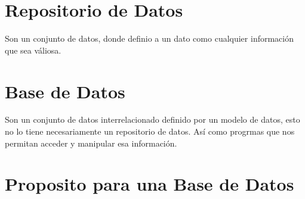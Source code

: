 \documentclass[12pt, fleqn]{report}                             %
\begin{document}
        \clearpage
        \section{Repositorio de Datos}
            
            Son un conjunto de datos, donde definio a un dato como cualquier información
            que sea váliosa.




        \section{Base de Datos}

            Son un conjunto de datos interrelacionado definido por un modelo de datos, esto no lo
            tiene necesariamente un repositorio de datos. Así como progrmas que nos permitan acceder
            y manipular esa información.




        \section{Proposito para una Base de Datos}
\end{document}
